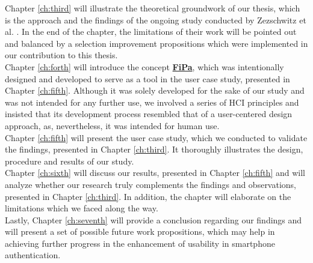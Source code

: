 Chapter \ref{ch:third} will illustrate the theoretical groundwork of our thesis, which is the approach and the findings of the ongoing study conducted by Zezschwitz et al. \cite{Zezschwitz}. In the end of the chapter, the limitations of their work will be pointed out and balanced by a selection improvement propositions which were implemented in our contribution to this thesis.\\

Chapter \ref{ch:forth} will introduce the concept \underline{\textbf{FiPa}}, which was intentionally designed and developed to serve as a tool in the user case study, presented in Chapter \ref{ch:fifth}. Although it was solely developed for the sake of our study and was not intended for any further use, we involved a series of HCI principles and insisted that its development process resembled that  of a user-centered design approach, as, nevertheless, it was intended for human use.\\

Chapter \ref{ch:fifth} will present the user case study, which we conducted to validate the findings, presented in Chapter \ref{ch:third}.
It thoroughly illustrates the design, procedure and results of our study.\\

Chapter \ref{ch:sixth} will discuss our results, presented in Chapter \ref{ch:fifth} and will analyze whether our research truly complements the findings and observations, presented in Chapter \ref{ch:third}. In addition, the chapter will elaborate on the limitations which we faced along the way. \\
 
Lastly, Chapter \ref{ch:seventh} will provide a conclusion regarding our findings  and will present a set of possible future work propositions, which may help in achieving further progress in the enhancement of usability in smartphone authentication.






